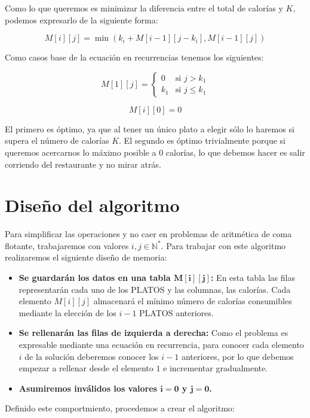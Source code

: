 Como lo que queremos es minimizar la diferencia entre el total de calorías y $K$, podemos expresarlo de la siguiente forma:

\[M[i][j]=\min(k_i+M[i-1][j-k_i],M[i-1][j])\]

Como casos base de la ecuación en recurrencias tenemos los siguientes:

\[
	M[1][j]=
	\begin{cases}
		0   & \text{si } j>k_1 \\
		k_1 & \text{si } j\leq k_1
	\end{cases}
\]

\[M[i][0]=0\]

El primero es óptimo, ya que al tener un único plato a elegir sólo lo haremos si supera el número de calorías $K$.
El segundo es óptimo trivialmente porque si queremos acercarnos lo máximo posible a $0$ calorías, lo que debemos hacer es salir corriendo del restaurante y no mirar atrás.

\pagebreak

\section{Diseño del algoritmo}

Para simplificar las operaciones y no caer en problemas de aritmética de coma flotante, trabajaremos con valores $i,j\in\mathbb{N^*}$.
Para trabajar con este algoritmo realizaremos el siguiente diseño de memoria:

\begin{itemize}
	\item\textbf{Se guardarán los datos en una tabla $\boldsymbol{M[i][j]}$:} En esta tabla las filas representarán cada uno de los PLATOS y las columnas, las calorías.
	Cada elemento $M[i][j]$ almacenará el mínimo número de calorías consumibles mediante la elección de los $i-1$ PLATOS anteriores.
	\item\textbf{Se rellenarán las filas de izquierda a derecha:} Como el problema es expresable mediante una ecuación en recurrencia, para conocer cada elemento $i$ de la solución deberemos conocer los $i-1$ anteriores, por lo que debemos empezar a rellenar desde el elemento $1$ e incrementar gradualmente.
	\item\textbf{Asumiremos inválidos los valores $\boldsymbol{i=0}$ y $\boldsymbol{j=0}$.}
\end{itemize}

Definido este comportmiento, procedemos a crear el algoritmo:

